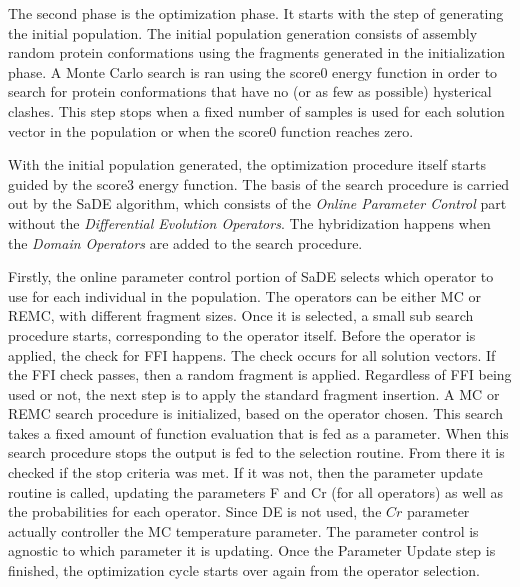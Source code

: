 The second phase is the optimization phase.  It starts with the step of
generating the initial population. The initial population generation consists
of assembly random protein conformations using the fragments generated in the
initialization phase. A Monte Carlo search is ran using the score0 energy
function in order to search for protein conformations that have no (or as few
as possible) hysterical clashes. This step stops when a fixed number of samples
is used for each solution vector in the population or when the score0 function
reaches zero.

With the initial population generated, the optimization procedure itself starts
guided by the score3 energy function. The basis of the search procedure is
carried out by the \ac{SaDE} algorithm, which consists of the \textit{Online
Parameter Control} part without the \textit{Differential Evolution Operators}.
The hybridization happens when the \textit{Domain Operators} are added to the
search procedure.

Firstly, the online parameter control portion of \ac{SaDE} selects which
operator to use for each individual in the population.
%
The operators can be either \ac{MC} or \ac{REMC}, with different fragment sizes.
Once it is selected, a small sub search procedure starts, corresponding to the
operator itself.
%
Before the operator is applied, the check for \ac{FFI} happens. The check occurs
for all solution vectors. If the \ac{FFI} check passes, then a random fragment
is applied. Regardless of \ac{FFI} being used or not, the next step is to apply
the standard fragment insertion.
%
A \ac{MC} or \ac{REMC} search procedure is initialized,
based on the operator chosen. This search takes a fixed amount of function
evaluation that is fed as a parameter. When this search procedure stops the
output is fed to the selection routine. From there it is checked if the stop
criteria was met. If it was not, then the parameter update routine is called,
updating the parameters F and Cr (for all operators) as well as the
probabilities for each operator. Since \ac{DE} is not used, the $Cr$ parameter
actually controller the \ac{MC} temperature parameter. The parameter control is
agnostic to which parameter it is updating. Once the Parameter Update step is
finished, the optimization cycle starts over again from the operator selection.


